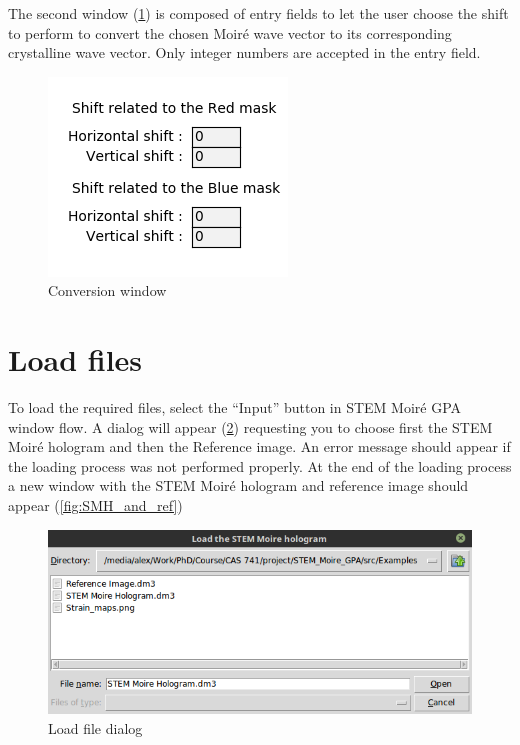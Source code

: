 \documentclass[12pt, titlepage]{article}
\newcommand{\progname}{STEM Moir{\'e} GPA}
\begin{document}
The second window (\cref{fig:nm_shift}) is composed of entry fields to let the user choose the shift to perform to convert the chosen Moir{\'e} wave vector to its corresponding crystalline wave vector. Only integer numbers are accepted in the entry field.

\begin{figure}[H]
\centering
\includegraphics[scale=1]{Figures/(n,m)_shift.png}
\caption{Conversion window}
\label{fig:nm_shift}
\end{figure}

\section{Load files}

To load the required files, select the \enquote{Input} button in \progname{} window flow. A dialog will appear (\cref{fig:load_files}) requesting you to choose first the STEM Moir{\'e} hologram and then the Reference image. An error message should appear if the loading process was not performed properly. At the end of the loading process a new window with the STEM Moir{\'e} hologram and reference image should appear (\cref{fig:SMH_and_ref})

\begin{figure}[H]
\centering
\includegraphics[scale=0.7]{Figures/Load_files.png}
\caption{Load file dialog}
\label{fig:load_files}
\end{figure}
\end{document}
